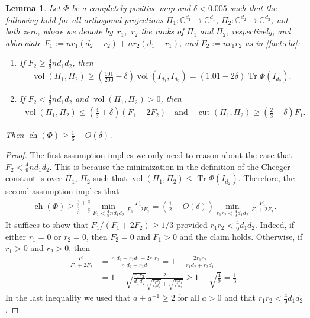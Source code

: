 \documentclass[aos]{imsart}
\newtheorem{lemma}[theorem]{Lemma}
\theoremstyle{definition}
\numberwithin{equation}{section}
\DeclareMathOperator{\vol}{vol}
\DeclareMathOperator{\cut}{cut}
\DeclareMathOperator{\ch}{ch}
\DeclareMathOperator{\tr}{Tr}
\newcommand{\C}{{\mathbb{C}}}
\begin{document}
\begin{appendix}
\begin{lemma}\label{lem:suff}
Let $\Phi$ be a completely positive map and $\delta<0.005$ such that the following hold for all orthogonal projections $\Pi_1\colon \C^{d_1} \to \C^{d_1}$, $\Pi_2 \colon \C^{d_2}\to\C^{d_2}$, not both zero, where we denote by~$r_1$,~$r_2$ the ranks of $\Pi_1$ and $\Pi_2$, respectively, and abbreviate $F_1 := n r_1(d_2 - r_2) + n r_2(d_1-r_1)$, and $F_2 := n r_1 r_2$ as in \cref{fact:chi}:
\begin{enumerate}
\item If $F_2 \geq \frac49 n d_1 d_2$, then
\begin{align}\label{eq:vol}
  \vol(\Pi_1, \Pi_2)
\geq \left(\frac{101}{200} - \delta\right) \vol(I_{d_1}, I_{d_2})
= \left(1.01 - 2\delta\right) \tr \Phi(I_{d_2}).
\end{align}
\item If $F_2 < \frac49 n d_1 d_2$ and $\vol(\Pi_1, \Pi_2)>0$, then
\begin{align}\label{eq:cut}
  \vol(\Pi_1, \Pi_2) \leq \left(\frac43 + \delta\right)\left(F_1 + 2 F_2\right) \quad\text{and}\quad
  \cut(\Pi_1, \Pi_2) \geq \left(\frac23 - \delta\right) F_1.
\end{align}
\end{enumerate}
Then $\ch(\Phi) \geq \frac16 - O(\delta)$.
\end{lemma}
\begin{proof}
The first assumption implies we only need to reason about the case that $F_2 < \frac49 n d_1 d_2$.
This is because the minimization in the definition of the Cheeger constant is over $\Pi_1$, $\Pi_2$ such that $\vol(\Pi_1, \Pi_2) \leq \tr \Phi(I_{d_2})$.
Therefore, the second assumption implies that
\begin{align*}
  \ch(\Phi)
\geq \frac{\frac43 + \delta}{\frac23 - \delta} \min_{F_2 < \frac49 n d_1 d_2} \frac{F_1}{F_1 + 2 F_2}
= \left( \frac12 - O(\delta) \right) \min_{r_1 r_2 < \frac49 d_1 d_2} \frac{F_1}{F_1 + 2 F_2}.
\end{align*}
It suffices to show that $F_1/(F_1 + 2 F_2) \geq 1/3$ provided $r_1 r_2 < \frac49 d_1 d_2$.
Indeed, if either $r_1 = 0$ or $r_2 = 0$, then $F_2 = 0$ and $F_1>0$ and the claim holds.
Otherwise, if $r_1>0$ and $r_2>0$, then
\begin{align*}
  \frac{F_1}{F_1 + 2 F_2}
&= \frac{r_1 d_2 + r_2 d_1 - 2 r_1 r_2}{r_1 d_2 + r_2 d_1}
= 1 - \frac{2 r_1 r_2}{r_1 d_2 + r_2 d_1} \\
&= 1 - \sqrt{\frac{r_1r_2}{d_1d_2}} \frac2{\sqrt{\frac{r_1 d_2}{r_2 d_1}} + \sqrt{\frac{r_2 d_1}{r_1 d_2}}}
\geq 1 - \sqrt{\frac49}
= \frac13.
\end{align*}
In the last inequality we used that $a + a^{-1} \geq 2$ for all $a>0$ and that $r_1 r_2 < \frac49 d_1 d_2$.
\end{proof}


\end{appendix}
\end{document}
